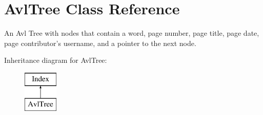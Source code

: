 \hypertarget{class_avl_tree}{\section{Avl\-Tree Class Reference}
\label{class_avl_tree}
}


An Avl Tree with nodes that contain a word, page number, page title, page date, page contributor's username, and a pointer to the next node.  


Inheritance diagram for Avl\-Tree\-:\begin{figure}[H]
\begin{center}
\leavevmode
\includegraphics[height=2.000000cm]{class_avl_tree}
\end{center}
\end{figure}
